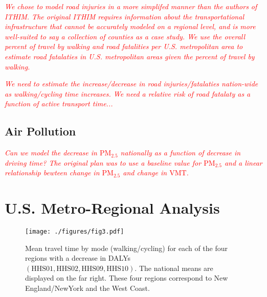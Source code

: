 \documentclass{bioinfo}
\newcommand{\col}[2][red]{\textcolor{#1}{#2}}
\newcommand{\pEm}[1]{$\mathrm{PM}_{#1}$}
\newcommand{\vmt}{$\mathrm{VMT}$}
\begin{document}
\begin{methods}
\col[red]{\textit{
We chose to model road injuries in a more simplifed manner than the
authors of ITHIM.  The original ITHIM requires information about the
transportational infrastructure that cannot be accurately modeled on a
regional level, and is more well-suited to say a collection of
counties as a case study. \cite{maizlish2013}  We use the overall percent
of travel by walking and road fatalities per U.S. metropolitan area to
estimate road fatalaties in U.S. metropolitan areas given the percent
of travel by walking. \cite{UWTechReport}
}}

\col[red]{\textit{
We need to estimate the increase/decrease in road injuries/fatalaties
nation-wide as walking/cycling time increases.  We need a relative
risk of road fatalaty as a function of active transport time...
}}

\subsection{Air Pollution}

\col[red]{\textit{
    Can we model the decrease in \pEm{2.5} nationally as a function of
decrease in driving time?  The original plan was to use a baseline
value for \pEm{2.5} and a linear relationship bewteen change in
\pEm{2.5} and change in \vmt{}.
}}

\end{methods}

\section{U.S. Metro-Regional Analysis}

\begin{figure}[t]
  \centerline{\texttt{[image: ./figures/fig3.pdf]}}
    \caption{Mean travel time by mode (walking/cycling) for each of
      the four regions with a decrease in DALYs
      $(\textrm{HHS01},\textrm{HHS02},\textrm{HHS09},\textrm{HHS10})$. The
      national means are displayed on the far right.  These four
      regions correspond to New England/NewYork and the West
      Coast.}\label{meanMatrices}
\end{figure}
\end{document}
